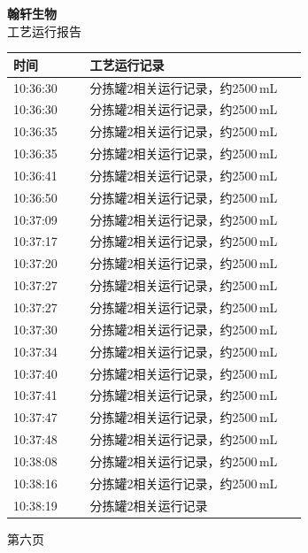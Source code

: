 \documentclass[UTF8,10pt,a4paper,fontset=fandol]{ctexart}
\begin{document}
\hfill
\begin{minipage}[t]{0.47\linewidth}
\centering
\textbf{翰轩生物}\\[-1mm]
工艺运行报告

\vspace{2mm}
\scriptsize
\begin{tabular}{|p{0.24\linewidth}|p{0.68\linewidth}|}
\hline
时间 & 工艺运行记录 \\ \hline
10:36:30 & 分拣罐2相关运行记录，约2500\,mL \\ \hline
10:36:30 & 分拣罐2相关运行记录，约2500\,mL \\ \hline
10:36:35 & 分拣罐2相关运行记录，约2500\,mL \\ \hline
10:36:35 & 分拣罐2相关运行记录，约2500\,mL \\ \hline
10:36:41 & 分拣罐2相关运行记录，约2500\,mL \\ \hline
10:36:50 & 分拣罐2相关运行记录，约2500\,mL \\ \hline
10:37:09 & 分拣罐2相关运行记录，约2500\,mL \\ \hline
10:37:17 & 分拣罐2相关运行记录，约2500\,mL \\ \hline
10:37:20 & 分拣罐2相关运行记录，约2500\,mL \\ \hline
10:37:27 & 分拣罐2相关运行记录，约2500\,mL \\ \hline
10:37:27 & 分拣罐2相关运行记录，约2500\,mL \\ \hline
10:37:30 & 分拣罐2相关运行记录，约2500\,mL \\ \hline
10:37:34 & 分拣罐2相关运行记录，约2500\,mL \\ \hline
10:37:40 & 分拣罐2相关运行记录，约2500\,mL \\ \hline
10:37:41 & 分拣罐2相关运行记录，约2500\,mL \\ \hline
10:37:47 & 分拣罐2相关运行记录，约2500\,mL \\ \hline
10:37:48 & 分拣罐2相关运行记录，约2500\,mL \\ \hline
10:38:08 & 分拣罐2相关运行记录，约2500\,mL \\ \hline
10:38:16 & 分拣罐2相关运行记录，约2500\,mL \\ \hline
10:38:19 & 分拣罐2相关运行记录 \\ \hline
\end{tabular}

\vspace{1mm}

第六页
\end{minipage}

\vspace{8mm}
\end{document}

